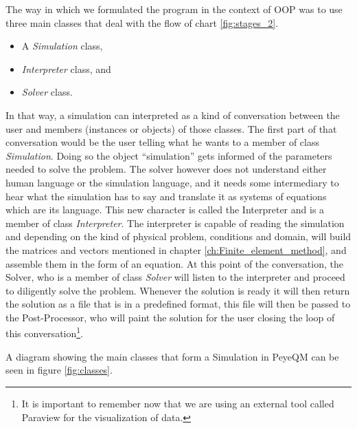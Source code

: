 The way in which we formulated the program in the context of OOP was to use three main classes that deal with the flow of chart \ref{fig:stages_2}.
\begin{itemize}
\item A \textit{Simulation} class,
\item \textit{Interpreter} class, and
\item \textit{Solver} class.
\end{itemize}
In that way, a simulation can interpreted as a kind of conversation between the user and members (instances or objects) of those classes. The first part of that conversation would be the user telling what he wants to a member of class \textit{Simulation}. Doing so the object ``simulation'' gets informed of the parameters needed to solve the problem.  The solver however does not understand either human language or the simulation language, and it needs some intermediary to hear what the simulation has to say and translate it as systems of equations which are its language. This new character is called the Interpreter and is a member of class \textit{Interpreter}. The interpreter is capable of reading the simulation and depending on the kind of physical problem, conditions and domain, will build the matrices and vectors mentioned in chapter \ref{ch:Finite_element_method}, and assemble them in the form of an equation. At this point of the conversation, the Solver, who is a member of class \textit{Solver} will listen to the interpreter and proceed to diligently solve the problem. Whenever the solution is ready it will then return the solution as a file that is in a predefined format, this file will then be passed to the Post-Processor, who will paint the solution for the user closing the loop of this conversation\footnote{It is important to remember now that we are using an external tool called Paraview for the visualization of data.}. 

A diagram showing the main classes that form a Simulation in PeyeQM can be seen in figure \ref{fig:classes}.

